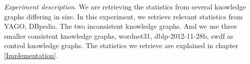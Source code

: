 \documentclass[11pt,letterpaper ,oneside ]{book}
\begin{document}
	\textit{Experiment description}. We are retrieving the statistics from several knowledge graphs differing in size. In this experiment, we retrieve relevant statistics from YAGO, DBpedia. The two inconsistent knowledge graphs. And we use three smaller consistent knowledge graphs, wordnet31, dblp-2012-11-28b, swdf as control knowledge graphs. The statistics we retrieve are explained in chapter \ref{Implementation}.  \\
	\begin{figure}[!t]
\end{figure}
	
\end{document}
